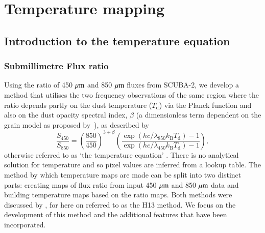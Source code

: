 \chapter{Temperature mapping}
\label{ch:chapter5}

\section{Introduction to the temperature equation}
\subsection{Submillimetre Flux ratio}
Using the ratio of 450\,$\,\mu\rm{m}$ and 850\,$\,\mu\rm{m}$ fluxes from SCUBA-2, 
we develop a method that utilises the two frequency observations of the same 
region where the ratio depends partly on the dust temperature ($T_{\mathrm{d}}$) 
via the Planck function and also on the dust opacity spectral index, $\beta$ 
(a dimensionless term dependent on the grain model as proposed by 
\citeauthor{Hildebrand:1983fy}\,\citeyear{Hildebrand:1983fy}), as described by 
\begin{equation}
\frac{S_{\mathrm{450}}}{S_{\mathrm{850}}} = \left ( \frac{850}{450} \right )^{3+\beta }\left ( \frac{\exp(hc/\lambda _{\mathrm{850}}k_{\mathrm{B}}T_{\mathrm{d}})-1}{\exp(hc/\lambda _{\mathrm{450}}k_{\mathrm{B}}T_{\mathrm{d}})-1} \right ), \label{eqn:temp}
\end{equation}
otherwise referred to as `the temperature equation' \citep{Reid:2005ly}.
There is no analytical solution for temperature and so pixel values are inferred from 
a lookup table. The method by which temperature maps are made can be split into 
two distinct parts: creating maps of flux ratio from input 450\,$\,\mu\rm{m}$ and 850\,$\,\mu\rm{m}$ 
data and building temperature maps based on the ratio maps. Both methods were 
discussed by \cite{Hatchell:2013ij}, for here on referred to as the H13 method. 
We focus on the development of this method and the additional features that have 
been incorporated.

